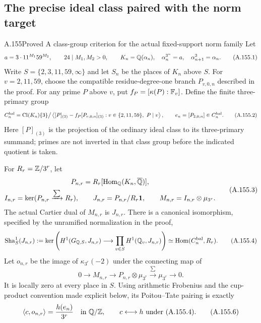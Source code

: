 \subsection{The precise ideal class paired with the norm target}

\begin{statement}{A.155}{Proved}
{A class-group criterion for the actual fixed-support norm family}
Let
\[
 a=3\cdot11^{M_1}59^{M_2},\qquad 24\mid M_1,M_2>0,
 \qquad K_n=\mathbb Q(\alpha_n),\quad \alpha_n^{3^n}=a,
 \quad\alpha_{n+1}^3=\alpha_n.
\tag{A.155.1}
\]
Write \(S=\{2,3,11,59,\infty\}\) and let \(S_n\) be the places
of \(K_n\) above \(S\).
For \(v=2,11,59\), choose the compatible residue-degree-one branch
\(P_{v,0,n}\) described in the proof.  For any prime \(P\) above
\(v\), put \(f_P=[\kappa(P):\mathbb F_v]\).
Define the finite three-primary group
\[
 C_n^{\rm bal}=
 \operatorname{Cl}(K_n)\{3\}\big/
 \left\langle
   [P]_{(3)}-f_P[P_{v,0,n}]_{(3)}:
       v\in\{2,11,59\},\ P\mid v
 \right\rangle,
 \qquad e_n=[P_{2,0,n}]\in C_n^{\rm bal}.
\tag{A.155.2}
\]
Here \([P]_{(3)}\) is the projection of the ordinary ideal class
to its three-primary summand; primes are not inverted in that class
group before the indicated quotient is taken.

For \(R_r=\mathbb Z/3^r\), let
\[
 \begin{gathered}
 P_{n,r}=R_r[\operatorname{Hom}_{\mathbb Q}(K_n,\overline{\mathbb Q})],\\
 I_{n,r}=\ker(P_{n,r}\xrightarrow{\sum}R_r),\qquad
 J_{n,r}=P_{n,r}/R_r\mathbf1,\qquad
 M_{n,r}=I_{n,r}\otimes\mu_{3^r}.
 \end{gathered}
\tag{A.155.3}
\]
The actual Cartier dual of \(M_{n,r}\) is \(J_{n,r}\).
There is a canonical isomorphism, specified by the unramified
normalization in the proof,
\[
 \operatorname{Sha}^1_S(J_{n,r})
    :=\ker\left(H^1(G_{\mathbb Q,S},J_{n,r})
               \longrightarrow\prod_{v\in S}H^1(\mathbb Q_v,J_{n,r})\right)
       \simeq\operatorname{Hom}(C_n^{\rm bal},R_r).
\tag{A.155.4}
\]
Let \(o_{n,r}\) be the image of \(\kappa_{3^r}(-2)\) under
the connecting map of
\[
 0\longrightarrow M_{n,r}\longrightarrow
       P_{n,r}\otimes\mu_{3^r}
         \xrightarrow{\sum}\mu_{3^r}\longrightarrow0.
\tag{A.155.5}
\]
It is locally zero at every place in \(S\).
Using arithmetic Frobenius and the cup-product convention made
explicit below, its Poitou--Tate pairing is exactly
\[
                    \langle c,o_{n,r}\rangle
                         =\frac{h(e_n)}{3^r}\quad\text{in }\mathbb Q/\mathbb Z,
 \qquad c\longleftrightarrow h
       \text{ under (A.155.4)}.
\tag{A.155.6}
\]


\end{statement}
